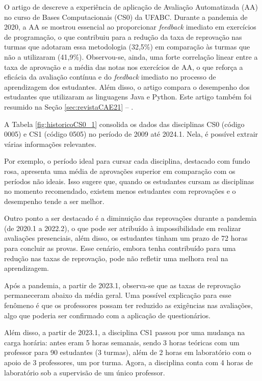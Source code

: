 O artigo de  descreve a experiência de aplicação de Avaliação Automatizada (AA) no curso de Bases Computacionais (CS0) da UFABC. Durante a pandemia de 2020, a AA se mostrou essencial ao proporcionar \textit{feedback} imediato em exercícios de programação, o que contribuiu para a redução da taxa de reprovação nas turmas que adotaram essa metodologia (32,5\%) em comparação às turmas que não a utilizaram (41,9\%). Observou-se, ainda, uma forte correlação linear entre a taxa de aprovação e a média das notas nos exercícios de AA, o que reforça a eficácia da avaliação contínua e do \textit{feedback} imediato no processo de aprendizagem dos estudantes. Além disso, o artigo compara o desempenho dos estudantes que utilizaram as linguagens Java e Python. Este artigo também foi resumido na Seção \ref{sec:revistaCAE21} -- .


A Tabela \ref{fig:historicoCS0_1} consolida os dados das disciplinas CS0 (código 0005) e CS1 (código 0505) no período de 2009 até 2024.1. Nela, é possível extrair várias informações relevantes.

Por exemplo, o período ideal para cursar cada disciplina, destacado com fundo rosa, apresenta uma média de aprovações superior em comparação com os períodos não ideais. Isso sugere que, quando os estudantes cursam as disciplinas no momento recomendado, existem menos estudantes com reprovações e o desempenho tende a ser melhor.

Outro ponto a ser destacado é a diminuição das reprovações durante a pandemia (de 2020.1 a 2022.2), o que pode ser atribuído à impossibilidade em realizar avaliações presenciais, além disso, os estudantes tinham um prazo de 72 horas para concluir as provas. Esse cenário, embora tenha contribuído para uma redução nas taxas de reprovação, pode não refletir uma melhora real na aprendizagem.

Após a pandemia, a partir de 2023.1, observa-se que as taxas de reprovação permaneceram abaixo da média geral. Uma possível explicação para esse fenômeno é que os professores possam ter reduzido as exigências nas avaliações, algo que poderia ser confirmado com a aplicação de questionários.

Além disso, a partir de 2023.1, a disciplina CS1 passou por uma mudança na carga horária: antes eram 5 horas semanais, sendo 3 horas teóricas com um professor para 90 estudantes (3 turmas), além de 2 horas em laboratório com o apoio de 3 professores, um por turma. Agora, a disciplina conta com 4 horas de laboratório sob a supervisão de um único professor.

